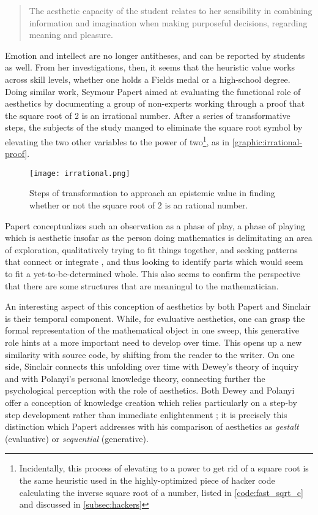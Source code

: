 \begin{quote}
    The aesthetic capacity of the student relates to her sensibility in combining information and imagination when making purposeful decisions, regarding meaning and pleasure. \citep{sinclair_aesthetic_2011}
\end{quote}

Emotion and intellect are no longer antitheses, and can be reported by students as well. From her investigations, then, it seems that the heuristic value works across skill levels, whether one holds a Fields medal or a high-school degree. Doing similar work, Seymour Papert aimed at evaluating the functional role of aesthetics by documenting a group of non-experts working through a proof that the square root of 2 is an irrational number. After a series of transformative steps, the subjects of the study manged to eliminate the square root symbol by elevating the two other variables to the power of two\footnote{Incidentally, this process of elevating to a power to get rid of a square root is the same heuristic used in the highly-optimized piece of hacker code calculating the inverse square root of a number, listed in \autoref{code:fast_sqrt_c} and discussed in \autoref{subsec:hackers}}, as in \autoref{graphic:irrational-proof}.

\begin{figure}
    \texttt{[image: irrational.png]}
    \caption{Steps of transformation to approach an epistemic value in finding whether or not the square root of 2 is an rational number.}
    \label{graphic:irrational-proof}
\end{figure}

Papert conceptualizes such an observation as a phase of play, a phase of playing which is aesthetic insofar as the person doing mathematics is delimitating an area of exploration, qualitatively trying to fit things together, and seeking patterns that connect or integrate \citep{papert_mathematical_1978}, and thus looking to identify parts which would seem to fit a yet-to-be-determined whole. This also seems to confirm the perspective that there are some structures that are meaningul to the mathematician.

An interesting aspect of this conception of aesthetics by both Papert and Sinclair is their temporal component. While, for evaluative aesthetics, one can grasp the formal representation of the mathematical object in one sweep, this generative role hints at a more important need to develop over time. This opens up a new similarity with source code, by shifting from the reader to the writer. On one side, Sinclair connects this unfolding over time with Dewey's theory of inquiry and with Polanyi's personal knowledge theory, connecting further the psychological perception with the role of aesthetics. Both Dewey and Polanyi offer a conception of knowledge creation which relies particularly on a step-by step development rather than immediate enlightenment \citep{polanyi_knowing_1969,sinclair_roles_2004}; it is precisely this distinction which Papert addresses with his comparison of aesthetics as \emph{gestalt} (evaluative) or \emph{sequential} (generative).

